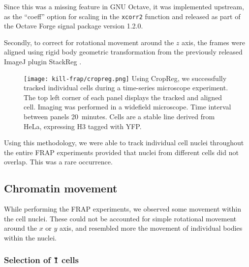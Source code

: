       Since this was a missing feature in GNU Octave, it was implemented
      upstream, as the ``coeff'' option for scaling in the
      \texttt{xcorr2} function and released as part of the Octave Forge
      signal package version 1.2.0.


      Secondly, to correct for rotational movement around the $z$ axis, the
      frames were aligned using rigid body geometric transformation from the
      previously released ImageJ plugin StackReg \citep{stackreg}.

      \begin{figure}
        \centering
        \texttt{[image: kill-frap/cropreg.png]}
          {
            Using CropReg, we successfully tracked individual cells during
            a time-series microscope experiment. The top left corner of each
            panel displays the tracked and aligned cell. Imaging was performed
            in a widefield microscope. Time interval between panels 20~minutes.
            Cells are a stable line derived from HeLa, expressing H3 tagged
            with YFP.
          }
        \label{fig:kill-frap:cropreg}
      \end{figure}

      Using this methodology, we were able to track individual cell nuclei
      throughout the entire FRAP experiments  provided
      that nuclei from different cells did not overlap. This was a rare occurrence.

  \subsection{Chromatin movement}

    While performing the FRAP experiments, we observed some movement
    within the cell nuclei. These could not be accounted for simple rotational
    movement around the $x$ or $y$ axis, and resembled more the movement
    of individual bodies within the nuclei.

    \subsubsection{Selection of \G1{} cells}

